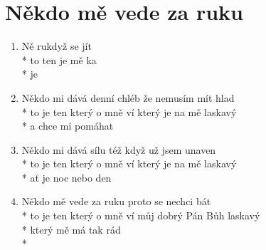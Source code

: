 \section{Někdo mě vede za ruku}
\begin{enumerate}
\item Ně    rukdyž  se jít  \\*
to ten     je  mě ka\\*
je   
\item Někdo mi dává denní chléb že nemusím mít hlad \\*
to je ten který o mně ví který je na mě laskavý \\*
a chce mi pomáhat 
\item Někdo mi dává sílu též když už jsem unaven \\*
to je ten který o mně ví který je na mě laskavý \\*
ať je noc nebo den 
\item Někdo mě vede za ruku proto se nechci bát \\*
to je ten který o mně ví můj dobrý Pán Bůh laskavý \\*
který mě má tak rád \\*
\end{enumerate}
